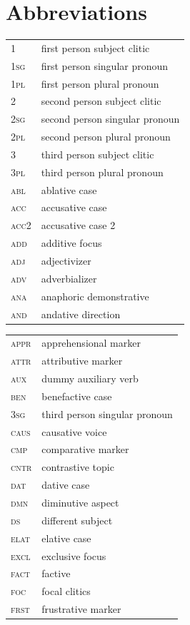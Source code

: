 \documentclass[output=paper,colorlinks,citecolor=brown]{langscibook}
\begin{document}
\section*{Abbreviations}
\begin{tabularx}{.49\textwidth}{@{}lQ}
\textsc{1}       & first person   subject clitic \\
\textsc{1sg}     & first person   singular pronoun \\
\textsc{1pl}     & first person   plural pronoun \\
\textsc{2}       & second person   subject clitic \\
\textsc{2sg}     & second person   singular pronoun \\
\textsc{2pl}     & second person   plural pronoun \\
\textsc{3}       & third person   subject clitic \\
\textsc{3pl}     & third person   plural pronoun \\
\textsc{abl}     & ablative case \\
\textsc{acc}     & accusative case \\
\textsc{acc2}    & accusative case 2 \\
\textsc{add}     & additive focus \\
\textsc{adj}     & adjectivizer \\
\textsc{adv}     & adverbializer \\
\textsc{ana}     & anaphoric demonstrative \\
\textsc{and}     & andative direction \\\end{tabularx}
\begin{tabularx}{.45\textwidth}{lQ@{}}
\textsc{appr}    & apprehensional marker \\
\textsc{attr}    & attributive marker \\
\textsc{aux}     & dummy auxiliary verb \\
\textsc{ben}     & benefactive case \\
\textsc{3sg}     & third person   singular pronoun \\
\textsc{caus}    & causative voice \\
\textsc{cmp}     & comparative marker \\
\textsc{cntr}    & contrastive topic \\
\textsc{dat}     & dative case \\
\textsc{dmn}     & diminutive aspect \\
\textsc{ds}      & different subject \\
\textsc{elat}    & elative case \\
\textsc{excl}    & exclusive focus \\
\textsc{fact}    & factive \\
\textsc{foc}     & focal clitics \\
\textsc{frst}    & frustrative marker \\\end{tabularx}
\end{document}
